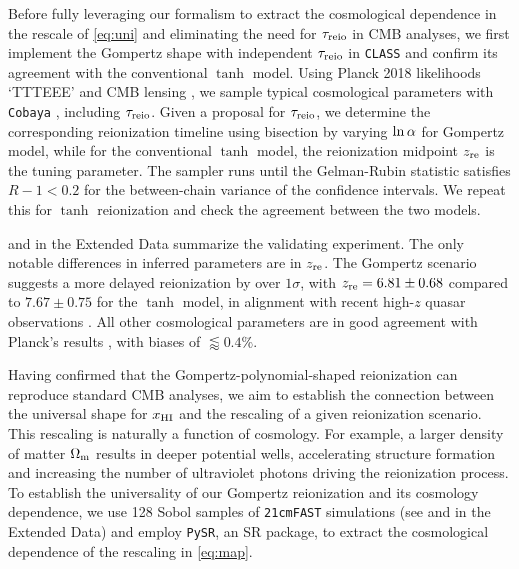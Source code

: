 Before fully leveraging our formalism to extract the cosmological
dependence in the rescale of \cref{eq:uni} and eliminating the
need for $\tau_{\mathrm{reio}}$ in CMB analyses, we first implement the Gompertz
shape with independent $\tau_{\mathrm{reio}}$ in \texttt{CLASS} and confirm its
agreement with the conventional $\tanh$ model.
Using Planck 2018 likelihoods `TTTEEE' \cite{Planck2020c} and CMB
lensing \cite{Planck2020d}, we sample typical cosmological parameters
with \texttt{Cobaya} \cite{Torrado2020}, including $\tau_{\mathrm{reio}}$. Given a proposal for
$\tau_{\mathrm{reio}}$, we determine the corresponding reionization timeline using bisection by varying 
$\ln\alpha$ for Gompertz model, while for the conventional $\tanh$ model, 
the reionization midpoint $z_{\mathrm{re}}$ is the tuning parameter. 
The sampler runs until the Gelman-Rubin statistic \cite{Gelman1992}
satisfies $R - 1 < 0.2$ for the between-chain variance of the confidence
intervals.
We repeat this for $\tanh$ reionization and check the agreement between the two models.  

 and  in the Extended Data summarize the
validating experiment.
The only notable differences in inferred parameters are in $z_{\mathrm{re}}$.
The Gompertz scenario suggests a more delayed reionization by over
$1\sigma$, with $z_{\mathrm{re}} = 6.81 \pm 0.68$ compared to $7.67 \pm 0.75$ for
the $\tanh$ model, in alignment with recent high-$z$ quasar observations
\cite{Keating2020}.
All other cosmological parameters are in good agreement with Planck's
results \cite{Planck2020a}, with biases of $\lessapprox 0.4 \%$.

Having confirmed that the Gompertz-polynomial-shaped reionization can
reproduce standard CMB analyses,  we aim to establish the connection
between the universal shape for $x_{\mathrm{HI}}$ and the rescaling of a given
reionization scenario.
This rescaling is naturally a function of cosmology.
For example, a larger density of matter $\Omega_\mathrm{m}$ results in deeper
potential wells, accelerating structure formation and increasing the
number of ultraviolet photons driving the reionization process.
To establish the universality of our Gompertz reionization and its
cosmology dependence, we use 128 Sobol samples of \texttt{21cmFAST} simulations
(see  and  in the Extended Data)
and employ \texttt{PySR}, an SR package, to extract the cosmological
dependence of the rescaling in \cref{eq:map}.

